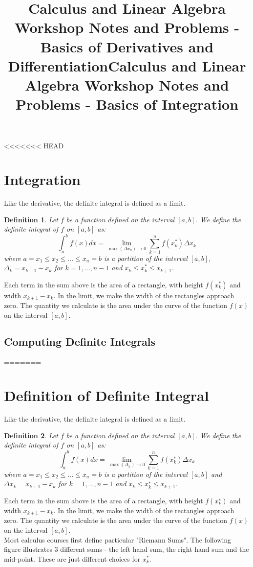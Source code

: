 \documentclass[12pt,a4paper]{article} %
\title{Calculus and Linear Algebra Workshop Notes and Problems - Basics of Derivatives and Differentiation}
\title{Calculus and Linear Algebra Workshop Notes and Problems - Basics of Integration}
\newtheorem{defn}{Definition}
\begin{document}
\maketitle
<<<<<<< HEAD
\section{Integration}
Like the derivative, the definite integral is defined as a limit.
\begin{defn}
Let $f$ be a function defined on the interval $[a,b]$. We define the definite integral of $f$ on $[a,b]$ as:
$$\int_a^bf(x)dx	=	\lim_{\max(\Delta x_k)\rightarrow 0}\sum_{k=1}^nf(x_k^*)\Delta x_k$$
where $a=x_1\leq x_2\leq ... \leq x_n=b$ is a partition of the interval $[a,b]$, $\Delta_k = x_{k+1}-x_k$ for $k=1,...,n-1$ and $x_k\leq x_k^*\leq x_{k+1}$. 
\end{defn}
Each term in the sum above is the area of a rectangle, with height $f(x_k^*)$ and width $x_{k+1}-x_k$. In the limit, we make the width of the rectangles approach zero. The quantity we calculate is the area under the curve of the function $f(x)$ on the interval $[a,b]$.
\subsection{Computing Definite Integrals}

=======
\section{Definition of Definite Integral}
Like the derivative, the definite integral is defined as a limit.
\begin{defn}
Let $f$ be a function defined on the interval $[a, b]$. We define the definite
integral of $f$ on $[a, b]$ as:
$$\int_a^b f(x)dx = \lim_{\max(\Delta_x)\rightarrow 0}\sum_{k=1}^n f (x^∗_k )\Delta x_k$$
where $a = x_1 \leq x_2 \leq ... \leq x_n = b$ is a partition of the interval $[a, b]$ and $\Delta x_k = x_{k+1} − x_k$
for $k = 1, ..., n − 1$ and $x_k \leq x^∗_k \leq x_{k+1}$.
\end{defn}
Each term in the sum above is the area of a rectangle, with height $f (x^∗_k)$ and width
$x_{k+1} − x_k$. In the limit, we make the width of the rectangles approach zero. The
quantity we calculate is the area under the curve of the function $f(x)$ on the interval
$[a, b]$.\\
Most calculus courses first define particular "Riemann Sums". The following figure illustrates 3 different sums - the left hand sum, the right hand sum and the mid-point. These are just different choices for $x^*_k$. \\\\
\end{document}
